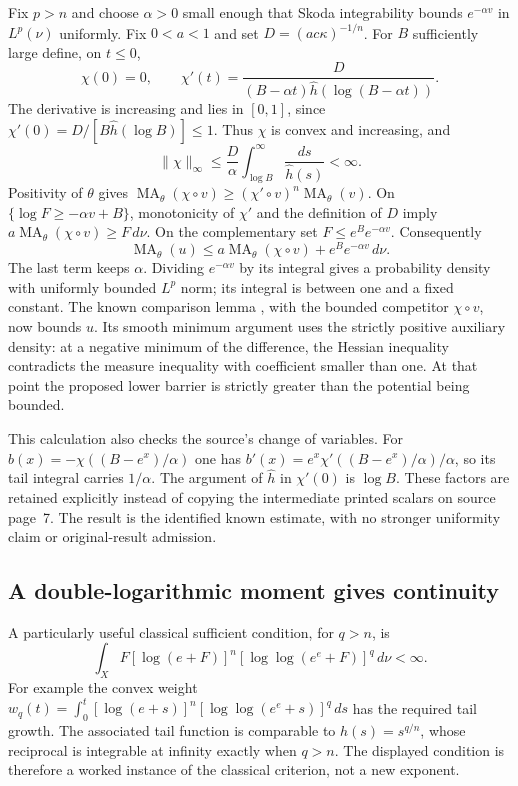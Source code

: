 Fix $p>n$ and choose $\alpha>0$ small enough that Skoda integrability
bounds $e^{-\alpha v}$ in $L^p(\nu)$ uniformly. Fix $0<a<1$ and set
$D=(ac\kappa)^{-1/n}$. For $B$ sufficiently large define, on $t\leq0$,
\[
 \chi(0)=0,\qquad
 \chi'(t)=\frac{D}{(B-\alpha t)
                     \widehat h(\log(B-\alpha t))}.
\]
The derivative is increasing and lies in $[0,1]$, since
$\chi'(0)=D/[B\widehat h(\log B)]\leq1$.
Thus $\chi$ is convex and increasing, and
\[
 \|\chi\|_\infty
    \leq\frac{D}{\alpha}
       \int_{\log B}^{\infty}\frac{ds}{\widehat h(s)}<\infty.
\]
Positivity of $\theta$ gives
$\operatorname{MA}_\theta(\chi\circ v)
 \geq(\chi'\circ v)^n\operatorname{MA}_\theta(v)$.
On $\{\log F\geq-\alpha v+B\}$, monotonicity of $\chi'$ and
the definition of $D$ imply
$a\operatorname{MA}_\theta(\chi\circ v)\geq F\,d\nu$.
On the complementary set $F\leq e^Be^{-\alpha v}$. Consequently
\[
\tag{68.23aa}\label{eq:ytd-orlicz-convex-comparison}
 \operatorname{MA}_\theta(u)
  \leq a\operatorname{MA}_\theta(\chi\circ v)
           +e^Be^{-\alpha v}\,d\nu.
\]
The last term keeps $\alpha$. Dividing $e^{-\alpha v}$ by its
integral gives a probability density with uniformly bounded $L^p$ norm;
its integral is between one and a fixed constant. The known comparison
lemma \cite[Lemma~2.2]{GuedjLu25FromYauV2}, with the bounded competitor
$\chi\circ v$, now bounds $u$. Its smooth minimum argument uses the
strictly positive auxiliary density: at a negative minimum of the
difference, the Hessian inequality contradicts the measure inequality
with coefficient smaller than one. At that point the proposed lower
barrier is strictly greater than the potential being bounded.

This calculation also checks the source's change of variables. For
$b(x)=-\chi((B-e^x)/\alpha)$ one has
$b'(x)=e^x\chi'((B-e^x)/\alpha)/\alpha$, so its tail integral carries
$1/\alpha$. The argument of $\widehat h$ in $\chi'(0)$ is $\log B$.
These factors are retained explicitly instead of copying the intermediate
printed scalars on source page~7. The result is the identified known
estimate, with no stronger uniformity claim or original-result admission.

\subsection{A double-logarithmic moment gives continuity}
\label{sec:ytd-orlicz-loglog}

A particularly useful classical sufficient condition, for $q>n$, is
\[
\tag{68.23ab}\label{eq:ytd-orlicz-loglog-moment}
 \int_XF[\log(e+F)]^n
          [\log\log(e^e+F)]^q\,d\nu<\infty.
\]
For example the convex weight
$w_q(t)=\int_0^t[\log(e+s)]^n[\log\log(e^e+s)]^q\,ds$
has the required tail growth. The associated tail function is comparable
to $h(s)=s^{q/n}$, whose reciprocal is integrable at infinity exactly
when $q>n$. The displayed condition is therefore a worked instance of
the classical criterion, not a new exponent.

